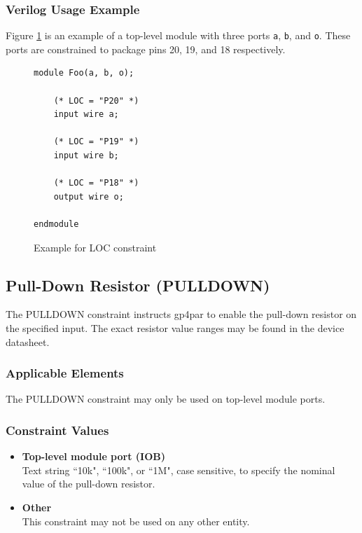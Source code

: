 \documentclass{article}
\begin{document}
\subsubsection{Verilog Usage Example}

Figure \ref{constraint-loc} is an example of a top-level module with three ports \texttt{a}, \texttt{b}, and \texttt{o}.
These ports are constrained to package pins 20, 19, and 18 respectively.

\begin{figure}[h]
\begin{lstlisting}
module Foo(a, b, o);

	(* LOC = "P20" *)
	input wire a;

	(* LOC = "P19" *)
	input wire b;

	(* LOC = "P18" *)
	output wire o;
	
endmodule
\end{lstlisting}
\caption{Example for LOC constraint}
\label{constraint-loc}
\end{figure}


\pagebreak
\subsection{Pull-Down Resistor (PULLDOWN)}

The PULLDOWN constraint instructs gp4par to enable the pull-down resistor on the specified input. The exact resistor 
value ranges may be found in the device datasheet.

\subsubsection{Applicable Elements}
The PULLDOWN constraint may only be used on top-level module ports. 

\subsubsection{Constraint Values}
\begin{itemize}
\item {\bfseries Top-level module port (IOB)}\\
Text string ``10k", ``100k", or ``1M", case sensitive, to specify the nominal value of the pull-down resistor.
\item {\bfseries Other} \\
This constraint may not be used on any other entity.
\end{itemize}
\end{document}
